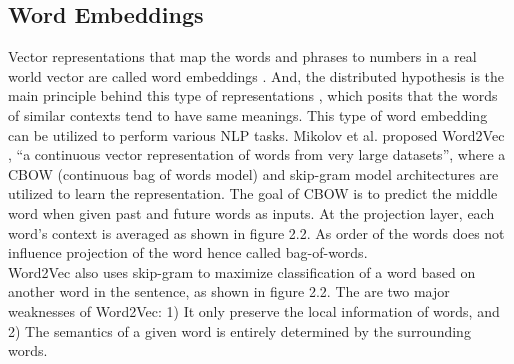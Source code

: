 \documentclass[%
	BCOR=8mm, %
	DIV=12,
	toc=bibliography, %
	toc=listof, %
	oneside, %
	egregdoesnotlikesansseriftitles, %
	]{scrbook}
\begin{document}
\subsection{Word Embeddings}
\label{subsection:wordembeddings}
Vector representations that map the words and phrases to numbers in a real world vector are called  word embeddings \cite{almeida_word_2019-1}. And, the distributed hypothesis is the main principle behind this type of representations \cite{harris_distributional_1954}, which posits that the words of similar contexts tend to have same meanings. This type of word embedding can be utilized to perform various NLP tasks. Mikolov et al. \cite{mikolov_efficient_2013} proposed Word2Vec , ``a continuous vector representation of words from very large datasets'', where a CBOW (continuous bag of words model) and skip-gram model architectures are utilized to learn the representation. The goal of CBOW is to predict the middle word when given past and future words as inputs. At the projection layer, each word's context is averaged as shown in figure 2.2. As order of the words does not influence projection of the word hence called bag-of-words. \\
Word2Vec also uses skip-gram to maximize classification of a word based on another word in the  sentence, as shown in figure 2.2.  The are two major weaknesses of Word2Vec: 1) It only preserve the local information of words,  and 2) The semantics of a given word is entirely determined by the surrounding words.
\end{document}
